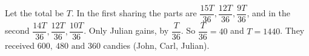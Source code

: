 Let the total be $T$. In the first sharing the parts are $\dfrac{15T}{36},\dfrac{12T}{36},\dfrac{9T}{36}$, and in the second $\dfrac{14T}{36},\dfrac{12T}{36},\dfrac{10T}{36}$. Only Julian gains, by $\dfrac{T}{36}$. So $\dfrac{T}{36}=40$ and $T=1440$. They received $\boxed{600,\ 480\text{ and }360}$ candies (John, Carl, Julian).
